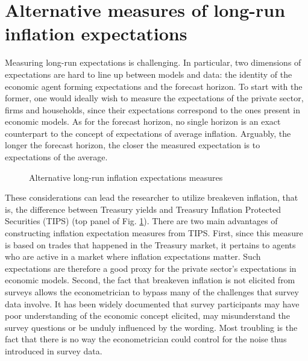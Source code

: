 \documentclass[11pt]{article}
\def \myFigPath {../../figures/}
\renewcommand{\[}{\begin{equation}}
\renewcommand{\]}{\end{equation}}
\def\myFigScale{0.3}
\def\fignameMarketEPiMoreHorizons{epi_be_in_data_command_anchoring_in_data_14_Sep_2020_18_12_59}
\def\fignameSPFLiv{epi_in_data_command_anchoring_in_data_14_Sep_2020_18_12_59}
\begin{document}
\section{Alternative measures of long-run inflation expectations}\label{unanchoring_in_data}

Measuring long-run expectations is challenging. In particular, two dimensions of expectations are hard to line up between models and data: the identity of the economic agent forming expectations and the forecast horizon. To start with the former, one would ideally wish to measure the expectations of the private sector, firms and households, since their expectations correspond to the ones present in economic models. As for the forecast horizon, no single horizon is an exact counterpart to the concept of expectations of average inflation. Arguably, the longer the forecast horizon, the closer the measured expectation is to expectations of the average.

\begin{figure}[h!]
\caption{Alternative long-run inflation expectations measures}
\label{epi_alternative}
\end{figure}

These considerations can lead the researcher to utilize breakeven inflation, that is, the difference between Treasury yields and Treasury Inflation Protected Securities (TIPS) (top panel of Fig. \ref{epi_alternative}). There are two main advantages of constructing inflation expectation measures from TIPS. First, since this measure is based on trades that happened in the Treasury market, it pertains to agents who are active in a market where inflation expectations matter. Such expectations are therefore a good proxy for the private sector's expectations in economic models. Second, the fact that breakeven inflation is not elicited from surveys allows the econometrician to bypass many of the challenges that survey data involve. It has been widely documented that survey participants may have poor understanding of the economic concept elicited, may misunderstand the survey questions or be unduly influenced by the wording. Most troubling is the fact that there is no way the econometrician could control for the noise thus introduced in survey data. 
\end{document}
